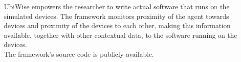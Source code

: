 UbiWise empowers the researcher to write actual software that runs on the simulated devices. The framework monitors proximity of the agent towards devices and proximity of the devices to each other, making this information available, together with other contextual data, to the software running on the devices.\\

The framework's source code is publicly available.
